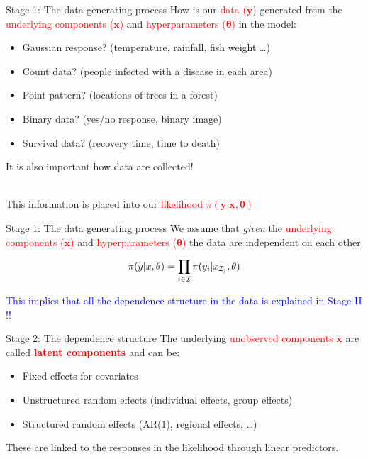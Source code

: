 \documentclass[
  ignorenonframetext,
]{beamer}
\providecommand{\tightlist}{%
  \setlength{\itemsep}{0pt}\setlength{\parskip}{0pt}}
\begin{document}
\begin{frame}{Stage 1: The data generating process}
\protect\hypertarget{stage-1-the-data-generating-process}{}
How is our \textcolor{red}{data (\(\boldsymbol{y}\))} generated from the
\textcolor{red}{underlying components  (\(\boldsymbol{x}\))} and
\textcolor{red}{hyperparameters (\(\boldsymbol{\theta}\))} in the model:

\begin{itemize}[<+->]
\tightlist
\item
  Gaussian response? (temperature, rainfall, fish weight \ldots)
\item
  Count data? (people infected with a disease in each area)
\item
  Point pattern? (locations of trees in a forest)
\item
  Binary data? (yes/no response, binary image)
\item
  Survival data? (recovery time, time to death)
\end{itemize}

It is also important how data are collected!\\
\strut \\

This information is placed into our
\textcolor{red}{\textcolor{red}{likelihood}
    \(\pi(\boldsymbol{y} | \boldsymbol{x}, \boldsymbol{\theta})\)}
\end{frame}

\begin{frame}{Stage 1: The data generating process}
\protect\hypertarget{stage-1-the-data-generating-process-1}{}
We assume that \emph{given} the
\textcolor{red}{underlying components    (\(\boldsymbol{x}\))} and
\textcolor{red}{hyperparameters (\(\boldsymbol{\theta}\))} the data are
independent on each other

\[
\pi(y|x,\theta) = \prod_{i\in\cal{I}}\pi(y_i|x_{\cal{I}_i},\theta)
\] \pause

\textcolor{blue}{This implies that all the dependence structure in the data is explained in Stage II !!}
\end{frame}

\begin{frame}{Stage 2: The dependence structure}
\protect\hypertarget{stage-2-the-dependence-structure}{}
The underlying \textcolor{red}{unobserved components \(\boldsymbol{x}\)}
are called \textcolor{red}{\bf{latent} components} and can be:

\begin{itemize}
\tightlist
\item
  Fixed effects for covariates
\item
  Unstructured random effects (individual effects, group effects)
\item
  Structured random effects (AR(1), regional effects, \ldots)
\end{itemize}

These are linked to the responses in the likelihood through linear
predictors.
\end{frame}
\end{document}
